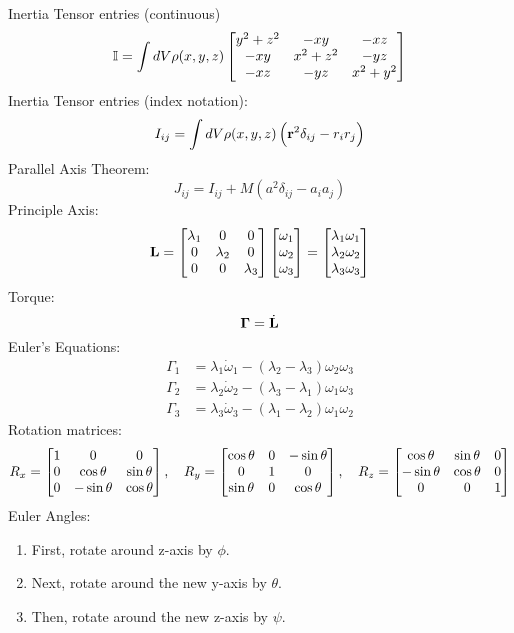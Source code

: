 Inertia Tensor entries (continuous)
\[\mathbb{I} = \int dV\rho(x, y, z)\begin{bmatrix}y^2 + z^2 & -xy & -xz \\ -xy & x^2 + z^2 & -yz \\ -xz & -yz & x^2 + y^2
\end{bmatrix}\]
Inertia Tensor entries (index notation):
\begin{equation}
    I_{ij} = \int dV\rho(x, y, z)\left(\mathbf{r}^2\delta_{ij} - r_ir_j\right)
\end{equation}
Parallel Axis Theorem:
\begin{equation}
    J_{ij} = I_{ij} + M(a^2\delta_{ij} - a_ia_j)
\end{equation}
Principle Axis:
\begin{equation}
    \mathbf{L} = \begin{bmatrix}\lambda_1 & 0 & 0 \\ 0 & \lambda_2 & 0 \\ 0 & 0 & \lambda_3\end{bmatrix}\begin{bmatrix}\omega_1 \\ \omega_2 \\ \omega_3\end{bmatrix} = \begin{bmatrix}\lambda_1\omega_1 \\ \lambda_2\omega_2 \\ \lambda_3\omega_3\end{bmatrix}
\end{equation}
Torque:
\begin{equation}
    \bm{\Gamma} = \dot{\mathbf{L}}
\end{equation}
Euler's Equations:
\begin{equation} \label{eq1}
\begin{split}
\Gamma_1 &= \lambda_1\dot{\omega}_1 - (\lambda_2 - \lambda_3)\omega_2\omega_3 \\
\Gamma_2 &= \lambda_2\dot{\omega}_2 - (\lambda_3 - \lambda_1)\omega_1\omega_3\\
\Gamma_3 &= \lambda_3\dot{\omega}_3 - (\lambda_1 - \lambda_2)\omega_1\omega_2
\end{split}
\end{equation}
Rotation matrices:
\begin{equation}
    R_x = \begin{bmatrix}1 & 0 & 0 \\ 0 & \cos\theta & \sin\theta \\ 0 & -\sin\theta & \cos\theta\end{bmatrix}, \quad R_y = \begin{bmatrix}\cos\theta & 0 & -\sin\theta \\ 0 & 1 & 0 \\ \sin\theta & 0 & \cos\theta\end{bmatrix}, \quad R_z = \begin{bmatrix}\cos\theta & \sin\theta & 0 \\ -\sin\theta & \cos\theta & 0 \\ 0 & 0 & 1\end{bmatrix}
\end{equation}
Euler Angles:
\begin{enumerate}[1.]
    \item First, rotate around z-axis by $\phi$.
    \item Next, rotate around the new y-axis by $\theta$.
    \item Then, rotate around the new z-axis by $\psi$.
\end{enumerate}
